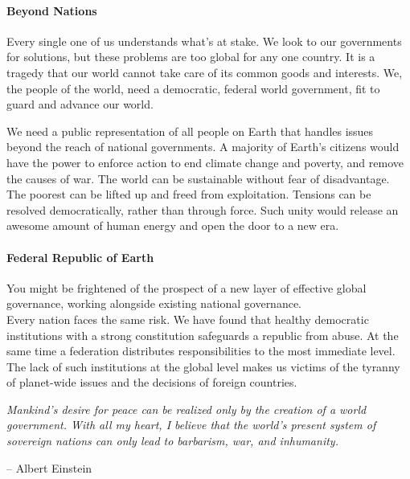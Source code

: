 \documentclass[11pt,a4paper]{article}
\begin{document}
\begin{multicols}{2}

\paragraph{Beyond Nations} 

Every single one of us understands what's at stake.
We look to our governments for solutions, but these problems are too global for any one country.
It is a tragedy that our world cannot take care of its common goods and interests.
We, the people of the world, need a democratic, federal world government, fit to guard and advance our world.

\noindent We need a public representation of all people on Earth that handles issues beyond the reach of national governments.
A majority of Earth's citizens would have the power to enforce action to end climate change and poverty, and remove the causes of war.
The world can be sustainable without fear of disadvantage.
The poorest can be lifted up and freed from exploitation.
Tensions can be resolved democratically, rather than through force.
Such unity would release an awesome amount of human energy and open the door to a new era.

\paragraph{Federal Republic of Earth}

You might be frightened of the prospect of a new layer of effective global governance, working alongside existing national governance.\\
\noindent Every nation faces the same risk.
We have found that healthy democratic institutions with a strong constitution safeguards a republic from abuse.
At the same time a federation distributes responsibilities to the most immediate level.
The lack of such institutions at the global level makes us victims of the tyranny of planet-wide issues and the decisions of foreign countries.

\begin{shaded*}
\noindent \textit{Mankind's desire for peace can be realized only by the creation of a world government. With all my heart, I believe that the world's present system of sovereign nations can only lead to barbarism, war, and inhumanity.}
\begin{flushright}
-- Albert Einstein
\end{flushright}
\vspace{-12pt}
\end{shaded*}


\end{multicols}
\end{document}
